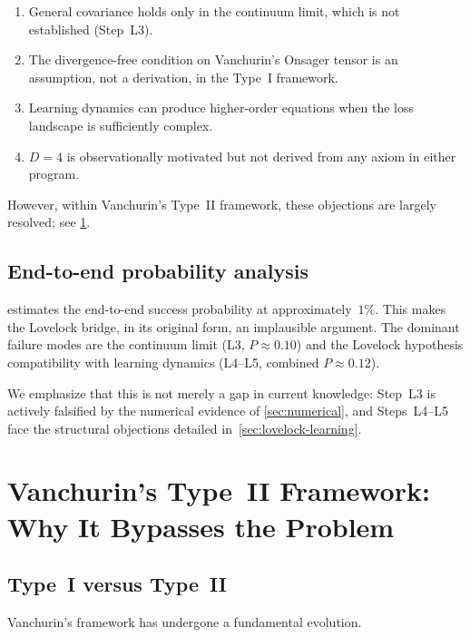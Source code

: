 \documentclass[11pt]{article}
\theoremstyle{definition}
\theoremstyle{remark}
\begin{document}
\begin{enumerate}
\item General covariance holds only in the continuum limit, which is not
  established (Step~L3).
\item The divergence-free condition on Vanchurin's Onsager tensor is an
  assumption, not a derivation, in the Type~I framework.
\item Learning dynamics can produce higher-order equations when the loss
  landscape is sufficiently complex.
\item $D = 4$ is observationally motivated but not derived from any axiom
  in either program.
\end{enumerate}

However, within Vanchurin's Type~II framework, these objections are
largely resolved; see \cref{sec:typeII}.

\subsection{End-to-end probability analysis}
\label{sec:probability-analysis}

 estimates the end-to-end success probability at
approximately~$1\%$.
This makes the Lovelock bridge, in its original form, an implausible
argument.
The dominant failure modes are the continuum limit (L3, $P \approx 0.10$)
and the Lovelock hypothesis compatibility with learning dynamics
(L4--L5, combined $P \approx 0.12$).

We emphasize that this is not merely a gap in current knowledge: Step~L3
is actively falsified by the numerical evidence of \cref{sec:numerical},
and Steps~L4--L5 face the structural objections detailed
in~\cref{sec:lovelock-learning}.

\section{Vanchurin's Type~II Framework: Why It Bypasses the Problem}
\label{sec:typeII}

\subsection{Type~I versus Type~II}
\label{sec:type-I-vs-II}

Vanchurin's framework has undergone a fundamental evolution.
\end{document}
